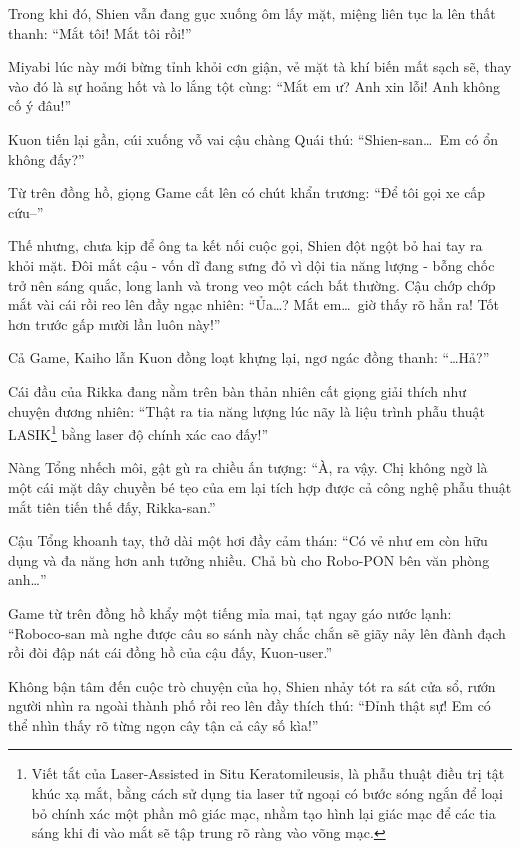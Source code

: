 \documentclass[../main.tex]{subfiles}
\begin{document}
Trong khi đó, Shien vẫn đang gục xuống ôm lấy mặt, miệng liên tục la lên thất thanh: ``Mắt tôi! Mắt tôi rồi!''

Miyabi lúc này mới bừng tỉnh khỏi cơn giận, vẻ mặt tà khí biến mất sạch sẽ, thay vào đó là sự hoảng hốt và lo lắng tột cùng: ``Mắt em ư? Anh xin lỗi! Anh không cố ý đâu!''

Kuon tiến lại gần, cúi xuống vỗ vai cậu chàng Quái thú: ``Shien-san\dots\ Em có ổn không đấy?''

Từ trên đồng hồ, giọng Game cất lên có chút khẩn trương: ``Để tôi gọi xe cấp cứu--''

Thế nhưng, chưa kịp để ông ta kết nối cuộc gọi, Shien đột ngột bỏ hai tay ra khỏi mặt. Đôi mắt cậu - vốn dĩ đang sưng đỏ vì dội tia năng lượng - bỗng chốc trở nên sáng quắc, long lanh và trong veo một cách bất thường. Cậu chớp chớp mắt vài cái rồi reo lên đầy ngạc nhiên: ``Ủa\dots? Mắt em\dots\ giờ thấy rõ hẳn ra! Tốt hơn trước gấp mười lần luôn này!''


Cả Game, Kaiho lẫn Kuon đồng loạt khựng lại, ngơ ngác đồng thanh: ``\dots Hả?''

Cái đầu của Rikka đang nằm trên bàn thản nhiên cất giọng giải thích như chuyện đương nhiên: ``Thật ra tia năng lượng lúc nãy là liệu trình phẫu thuật LASIK\footnote{Viết tắt của Laser-Assisted in Situ Keratomileusis, là phẫu thuật điều trị tật khúc xạ mắt, bằng cách sử dụng tia laser  tử ngoại có bước sóng ngắn để loại bỏ chính xác một phần mô giác mạc, nhằm tạo hình lại giác mạc để các tia sáng khi đi vào mắt sẽ tập trung rõ ràng vào võng mạc.} bằng laser độ chính xác cao đấy!''

Nàng Tổng nhếch môi, gật gù ra chiều ấn tượng: ``À, ra vậy. Chị không ngờ là một cái mặt dây chuyền bé tẹo của em lại tích hợp được cả công nghệ phẫu thuật mắt tiên tiến thế đấy, Rikka-san.''

Cậu Tổng khoanh tay, thở dài một hơi đầy cảm thán: ``Có vẻ như em còn hữu dụng và đa năng hơn anh tưởng nhiều. Chả bù cho Robo-PON bên văn phòng anh\dots''

Game từ trên đồng hồ khẩy một tiếng mỉa mai, tạt ngay gáo nước lạnh: ``Roboco-san mà nghe được câu so sánh này chắc chắn sẽ giãy nảy lên đành đạch rồi đòi đập nát cái đồng hồ của cậu đấy, Kuon-user.''

Không bận tâm đến cuộc trò chuyện của họ, Shien nhảy tót ra sát cửa sổ, rướn người nhìn ra ngoài thành phố rồi reo lên đầy thích thú: ``Đỉnh thật sự! Em có thể nhìn thấy rõ từng ngọn cây tận cả cây số kìa!''
\end{document}
